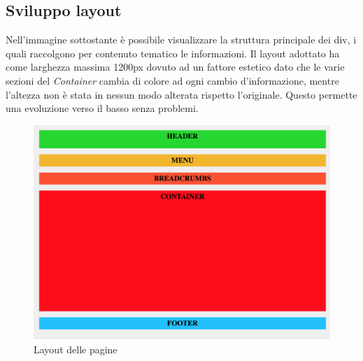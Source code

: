\documentclass[11pt]{article}
\begin{document}
\subsection{Sviluppo layout}
Nell'immagine sottostante è possibile visualizzare la struttura principale dei div, i quali raccolgono per contenuto tematico le informazioni.
Il layout adottato ha come larghezza massima 1200px dovuto ad un fattore estetico dato che le varie sezioni del \textit{Container} cambia di colore ad ogni cambio d'informazione, mentre l'altezza non è stata in nessun modo alterata rispetto l'originale. Questo permette una evoluzione verso il basso senza problemi.
\begin{figure}[H]	
	\centering
	\includegraphics[width=\linewidth]{layout.png}
	\caption{Layout delle pagine}
	\label{Layout delle pagine}
\end{figure}
\end{document}
